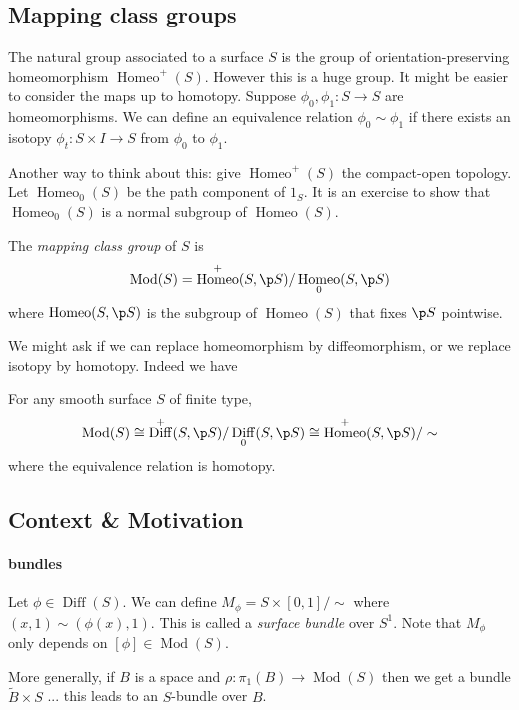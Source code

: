 \documentclass[a4paper]{article}
\DeclareMathOperator{\Homeo}{Homeo}
\DeclareMathOperator{\Diff}{Diff}
\DeclareMathOperator{\Mod}{Mod}
\renewcommand{\b}{\p}
\begin{document}
\subsection{Mapping class groups}

The natural group associated to a surface \(S\) is the group of orientation-preserving homeomorphism \(\Homeo^+(S)\). However this is a huge group. It might be easier to consider the maps up to homotopy. Suppose \(\phi_0, \phi_1: S \to S\) are homeomorphisms. We can define an equivalence relation \(\phi_0 \sim \phi_1\) if there exists an isotopy \(\phi_t: S \times I \to S\) from \(\phi_0\) to \(\phi_1\).

Another way to think about this: give \(\Homeo^+(S)\) the compact-open topology. Let \(\Homeo_0(S)\) be the path component of \(1_S\). It is an exercise to show that \(\Homeo_0(S)\) is a normal subgroup of \(\Homeo(S)\).

\begin{definition}
  The \emph{mapping class group} of \(S\) is
  \[
    \Mod(S) = \Homeo^+(S, \b S)/ \Homeo_0(S, \b S)
  \]
  where \(\Homeo(S, \b S)\) is the subgroup of \(\Homeo(S)\) that fixes \(\b S\) pointwise.
\end{definition}

We might ask if we can replace homeomorphism by diffeomorphism, or we replace isotopy by homotopy. Indeed we have

\begin{theorem}
  For any smooth surface \(S\) of finite type,
  \[
    \Mod(S) \cong \Diff^+(S, \b S)/ \Diff_0(S, \b S) \cong \Homeo^+(S, \b S)/ \sim
  \]
  where the equivalence relation is homotopy.
\end{theorem}

\subsection{Context \& Motivation}

\paragraph{bundles}

Let \(\phi \in \Diff(S)\). We can define \(M_\phi = S \times [0, 1]/ \sim\) where \((x, 1) \sim (\phi(x), 1)\). This is called a \emph{surface bundle} over \(S^1\). Note that \(M_\phi\) only depends on \([\phi] \in \Mod(S)\).

More generally, if \(B\) is a space and \(\rho: \pi_1(B) \to \Mod (S)\) then we get a bundle \(\tilde B \times S\) ... this leads to an \(S\)-bundle over \(B\).
\end{document}
